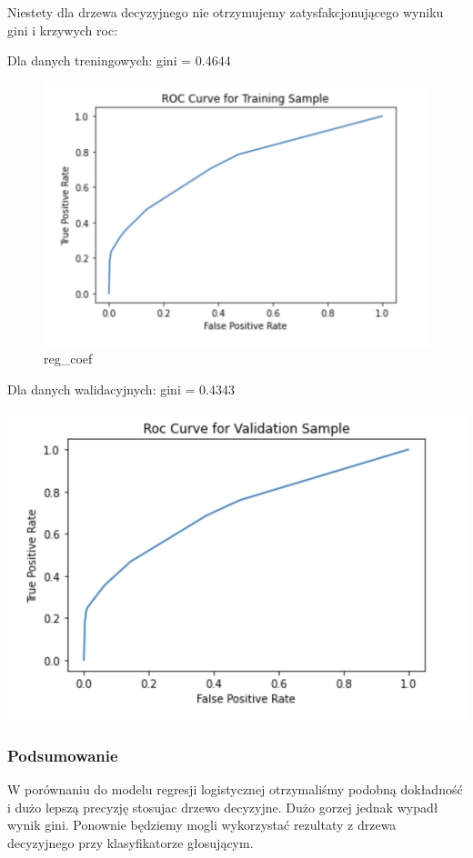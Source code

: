 \documentclass[11pt]{article}
\begin{document}
Niestety dla drzewa decyzyjnego nie otrzymujemy zatysfakcjonującego
wyniku gini i krzywych roc:

Dla danych treningowych: gini = 0.4644

\begin{figure}
\centering
\includegraphics{plots/dct_roc_train.png}
\caption{reg\_coef}
\end{figure}

Dla danych walidacyjnych: gini = 0.4343

\includegraphics{plots/dct_roc_val.png}

\hypertarget{podsumowanie}{%
\subsubsection{Podsumowanie}\label{podsumowanie}}

W porównaniu do modelu regresji logistycznej otrzymaliśmy podobną
dokładność i dużo lepszą precyzję stosujac drzewo decyzyjne. Dużo gorzej
jednak wypadł wynik gini. Ponownie będziemy mogli wykorzystać rezultaty
z drzewa decyzyjnego przy klasyfikatorze głosującym.
\end{document}
